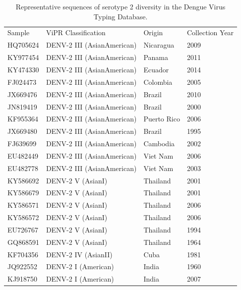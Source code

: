 \begin{longtable}{@{}llll@{}}
\caption{Representative sequences of serotype 2 diversity in the Dengue Virus Typing Database.}
\label{tab:chap4_s8}\\
Sample   & ViPR Classification        & Origin       & Collection Year \\
HQ705624 & DENV-2 III (AsianAmerican) & Nicaragua    & 2009            \\
KY977454 & DENV-2 III (AsianAmerican) & Panama       & 2011            \\
KY474330 & DENV-2 III (AsianAmerican) & Ecuador      & 2014            \\
FJ024473 & DENV-2 III (AsianAmerican) & Colombia     & 2005            \\
JX669476 & DENV-2 III (AsianAmerican) & Brazil       & 2010            \\
JN819419 & DENV-2 III (AsianAmerican) & Brazil       & 2000            \\
KF955364 & DENV-2 III (AsianAmerican) & Puerto Rico  & 2006            \\
JX669480 & DENV-2 III (AsianAmerican) & Brazil       & 1995            \\
FJ639699 & DENV-2 III (AsianAmerican) & Cambodia     & 2002            \\
EU482449 & DENV-2 III (AsianAmerican) & Viet Nam     & 2006            \\
EU482778 & DENV-2 III (AsianAmerican) & Viet Nam     & 2003            \\
KY586692 & DENV-2 V (AsianI)          & Thailand     & 2001            \\
KY586679 & DENV-2 V (AsianI)          & Thailand     & 2001            \\
KY586571 & DENV-2 V (AsianI)          & Thailand     & 2006            \\
KY586572 & DENV-2 V (AsianI)          & Thailand     & 2006            \\
EU726767 & DENV-2 V (AsianI)          & Thailand     & 1994            \\
GQ868591 & DENV-2 V (AsianI)          & Thailand     & 1964            \\
KF704356 & DENV-2 IV (AsianII)        & Cuba         & 1981            \\
JQ922552 & DENV-2 I (American)        & India        & 1960            \\
KJ918750 & DENV-2 I (American)        & India        & 2007            \\

\end{longtable}
